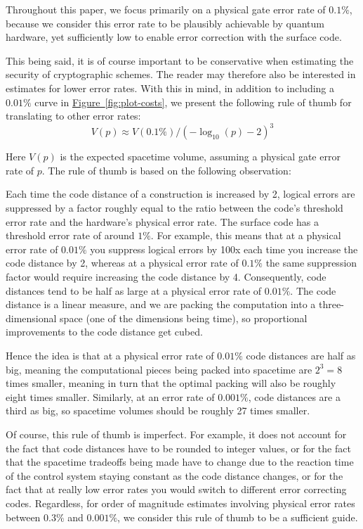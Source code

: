 \documentclass[a4paper, onecolumn, accepted=2021-03-29]{quantumarticle}
\newcommand{\fig}[1]{\hyperref[fig:#1]{Figure~\ref*{fig:#1}}}
\begin{document}
Throughout this paper, we focus primarily on a physical gate error rate of $0.1\%$, because we consider this error rate to be plausibly achievable by quantum hardware, yet sufficiently low to enable error correction with the surface code.

This being said, it is of course important to be conservative when estimating the security of cryptographic schemes.
The reader may therefore also be interested in estimates for lower error rates.
With this in mind, in addition to including a $0.01\%$ curve in \fig{plot-costs}, we present the following rule of thumb for translating to other error rates:
$$V(p) \approx V(0.1\%) / (-\log_{10}(p) - 2)^3$$

Here $V(p)$ is the expected spacetime volume, assuming a physical gate error rate of $p$.
The rule of thumb is based on the following observation:

Each time the code distance of a construction is increased by 2, logical errors are suppressed by a factor roughly equal to the ratio between the code's threshold error rate and the hardware's physical error rate.
The surface code has a threshold error rate of around $1\%$.
For example, this means that at a physical error rate of $0.01\%$ you suppress logical errors by 100x each time you increase the code distance by 2, whereas at a physical error rate of $0.1\%$ the same suppression factor would require increasing the code distance by 4.
Consequently, code distances tend to be half as large at a physical error rate of $0.01\%$.
The code distance is a linear measure, and we are packing the computation into a three-dimensional space (one of the dimensions being time), so proportional improvements to the code distance get cubed.

Hence the idea is that at a physical error rate of $0.01\%$ code distances are half as big, meaning the computational pieces being packed into spacetime are $2^3 = 8$ times smaller, meaning in turn that the optimal packing will also be roughly eight times smaller.
Similarly, at an error rate of $0.001\%$, code distances are a third as big, so spacetime volumes should be roughly 27 times smaller.

Of course, this rule of thumb is imperfect.
For example, it does not account for the fact that code distances have to be rounded to integer values, or for the fact that the spacetime tradeoffs being made have to change due to the reaction time of the control system staying constant as the code distance changes, or for the fact that at really low error rates you would switch to different error correcting codes.
Regardless, for order of magnitude estimates involving physical error rates between $0.3\%$ and $0.001\%$, we consider this rule of thumb to be a sufficient guide.
\end{document}

